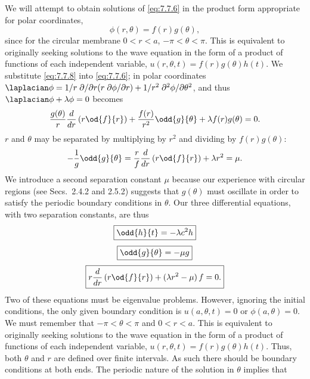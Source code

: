 We will attempt to obtain solutions of \eqref{eq:7.7.6} in the product form appropriate for polar coordinates,
\begin{equation}
\phi(r,\theta) = f(r)g(\theta),
\label{eq:7.7.8}
\end{equation}
since for the circular membrane $0 < r < a$, $-\pi < \theta < \pi$.  This is equivalent to originally seeking solutions to the wave equation in the form of a product of functions of each independent variable, $u(r,\theta,t) = f(r)g(\theta)h(t)$.  We substitute \eqref{eq:7.7.8} into \eqref{eq:7.7.6}; in polar coordinates $\laplacian\phi = 1/r\;\partial/\partial r(r\;\partial\phi/\partial r) + 1/r^2\;\partial^2\phi/\partial\theta^2$, and thus $\laplacian\phi + \lambda\phi = 0$ becomes
\begin{equation}
\frac{g(\theta)}{r}\frac{d}{d r}\left(r\od{f}{r}\right) + \frac{f(r)}{r^2}\odd{g}{\theta} + \lambda f(r)g(\theta) = 0.
\label{eq:7.7.9}
\end{equation}
$r$ and $\theta$ may be separated by multiplying by $r^2$ and dividing by $f(r)g(\theta)$:
\begin{equation}
-\frac{1}{g}\odd{g}{\theta} = \frac{r}{f}\frac{d}{d r}\left(r\od{f}{r}\right) + \lambda r^2 = \mu.
\label{eq:7.7.10}
\end{equation}
We introduce a second separation constant $\mu$ because our experience with circular regions (see Secs.~2.4.2 and 2.5.2) suggests that $g(\theta)$ must oscillate in order to satisfy the periodic boundary conditions in $\theta$.  Our three differential equations, with two separation constants, are thus
\begin{equation}
\boxed{\odd{h}{t} = -\lambda c^2 h}
\label{eq:7.7.11}
\end{equation}
\begin{equation}
\boxed{\odd{g}{\theta} = -\mu g}
\label{eq:7.7.12}
\end{equation}
\begin{equation}
\boxed{r\frac{d}{d r}\left(r\od{f}{r}\right) + (\lambda r^2 - \mu)\,f = 0.}
\label{eq:7.7.13}
\end{equation}
Two of these equations must be eigenvalue problems.  However, ignoring the initial conditions, the only given boundary condition is $u(a,\theta,t) = 0$ or $\phi(a,\theta) = 0$.  We must remember that $-\pi < \theta < \pi$ and $0 < r < a$.  This is equivalent to originally seeking solutions to the wave equation in the form of a product of functions of each independent variable, $u(r,\theta,t) = f(r)g(\theta)h(t)$.  Thus, both $\theta$ and $r$ are defined over finite intervals.  As such there should be boundary conditions at both ends.  The periodic nature of the solution in $\theta$ implies that
